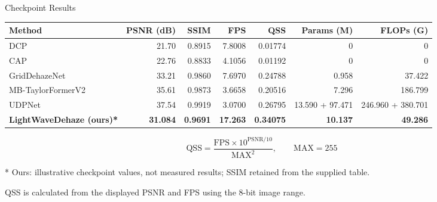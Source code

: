 \documentclass[aspectratio=169,10pt]{beamer}
\newcommand{\key}[1]{\textbf{\color{uetblue}#1}}
\begin{document}
\begin{frame}{Checkpoint Results}
  \vspace{0.12cm}
  {\fontsize{8pt}{10pt}\selectfont\color{uetdark}
  \setlength{\tabcolsep}{4pt}
  \renewcommand{\arraystretch}{1.65}
  \begin{tabularx}{\textwidth}{@{}>{\raggedright\arraybackslash}X r r r r r r@{}}
    \toprule
    \rowcolor{uetaccentbg}
    \key{Method} & \key{PSNR (dB)} & \key{SSIM} & \key{FPS} & \key{QSS} & \key{Params (M)} & \key{FLOPs (G)}\\
    \midrule
    DCP & 21.70 & 0.8915 & 7.8008 & 0.01774 & 0 & 0\\
    CAP & 22.76 & 0.8833 & 4.1056 & 0.01192 & 0 & 0\\
    GridDehazeNet & 33.21 & 0.9860 & 7.6970 & 0.24788 & 0.958 & 37.422\\
    MB-TaylorFormerV2 & 35.61 & 0.9873 & 3.6658 & 0.20516 & 7.296 & 186.799\\
    UDPNet & 37.54 & 0.9919 & 3.0700 & 0.26795 & 13.590 + 97.471 & 246.960 + 380.701\\
    \midrule
    \rowcolor{uetgreenbg}
    \textbf{LightWaveDehaze (ours)*} & \textbf{31.084} & \textbf{0.9691} & \textbf{17.263} & \textbf{0.34075} & \textbf{10.137} & \textbf{49.286}\\
    \bottomrule
  \end{tabularx}}\par
  \vspace{0.20cm}
  {\small
  \[
    \mathrm{QSS}=\frac{\mathrm{FPS}\times 10^{\mathrm{PSNR}/10}}{\mathrm{MAX}^{2}},
    \qquad \mathrm{MAX}=255
  \]}
  \vspace{-0.10cm}
  {\scriptsize\color{uetgray}* Ours: illustrative checkpoint values, not measured results; SSIM retained from the supplied table.\par
  QSS is calculated from the displayed PSNR and FPS using the 8-bit image range.}
\end{frame}
\end{document}
